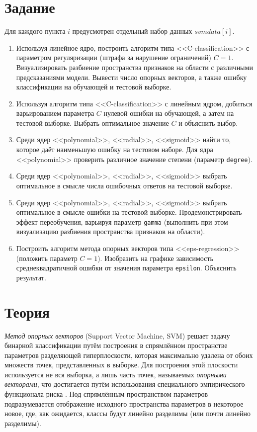 \documentclass[a4paper,12pt]{article} %
\begin{document}


\section{Задание}

Для каждого пункта $i$ предусмотрен отдельный набор данных $svmdata[i]$.

\begin{enumerate}[noitemsep]
    \item Используя линейное ядро, построить алгоритм типа <<C-classification>> с параметром регуляризации (штрафа за нарушение ограничений) $ C=1 $.
    Визуализировать разбиение пространства признаков на области с различными предсказаниями модели.
    Вывести число опорных векторов, а также ошибку классификации на обучающей и тестовой выборке.
    \item Используя алгоритм типа <<C-classification>> с линейным ядром, добиться варьированием параметра $ C $ нулевой ошибки на обучающей, а затем на тестовой выборке.
    Выбрать оптимальное значение $ C $ и объяснить выбор.
    \item Среди ядер <<polynomial>>, <<radial>>, <<sigmoid>> найти то, которое даёт наименьшую ошибку на тестовом наборе.
    Для ядра <<polynomial>> проверить различное значение степени (параметр \texttt{degree}).
    \item Среди ядер <<polynomial>>, <<radial>>, <<sigmoid>> выбрать оптимальное в смысле числа ошибочных ответов на тестовой выборке.
    \item Среди ядер <<polynomial>>, <<radial>>, <<sigmoid>> выбрать оптимальное в смысле ошибки на тестовой выборке.
    Продемонстрировать эффект переобучения, варьируя параметр \texttt{gamma} (выполнить при этом визуализацию разбиения пространства признаков на области).
    \item Построить алгоритм метода опорных векторов типа <<eps-regression>> (положить параметр $ C=1 $).
    Изобразить на графике зависимость среднеквадратичной ошибки от значения параметра \texttt{epsilon}.
    Объяснить результат.
\end{enumerate}

\newpage
\section{Теория}

\textit{Метод опорных векторов} (Support Vector Machine, SVM) решает задачу бинарной классификации путём построения в спрямлённом пространстве параметров разделяющей гиперплоскости, которая максимально удалена от обоих множеств точек, представленных в выборке.
Для построения этой плоскости используется не вся выборка, а лишь часть точек, называемых \textit{опорными векторами}, что достигается путём использования специального эмпирического функционала риска \cite{murphy}.
Под спрямлённым пространством параметров подразумевается отображение исходного пространства параметров в некоторое новое, где, как ожидается, классы будут линейно разделимы (или почти линейно разделимы).
\end{document}
